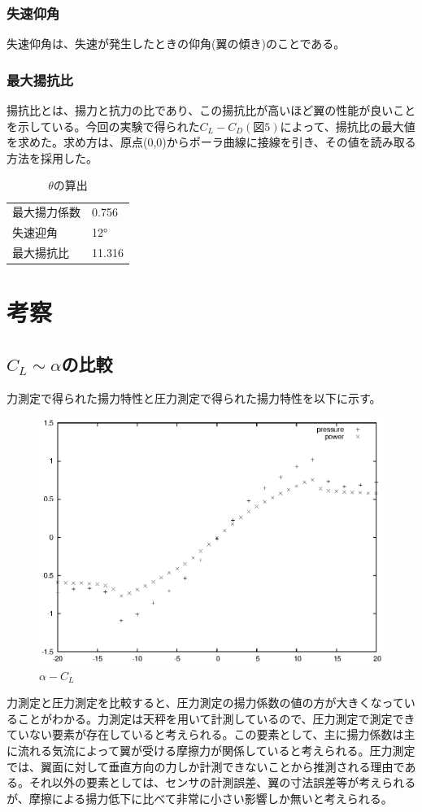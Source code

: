 \documentclass[a4j,twoside,openright,11pt]{jarticle}
\begin{document}
\subsubsection{失速仰角}
失速仰角は、失速が発生したときの仰角(翼の傾き)のことである。
\subsubsection{最大揚抗比}
揚抗比とは、揚力と抗力の比であり、この揚抗比が高いほど翼の性能が良いことを示している。今回の実験で得られた$C_L-C_D(図5)$によって、揚抗比の最大値を求めた。求め方は、原点(0,0)からポーラ曲線に接線を引き、その値を読み取る方法を採用した。

\begin{table}[htb]
\begin{center}
  \caption{$\theta$の算出}
  \begin{tabular}{ll} \hline
最大揚力係数 &0.756\\
失速迎角     &12°\\
最大揚抗比   &11.316\\
\hline
  \end{tabular}
\end{center}
\end{table}

\section{考察}
\subsection{$C_L \sim \alpha$の比較}
力測定で得られた揚力特性と圧力測定で得られた揚力特性を以下に示す。
\begin{figure}
\begin{center}
\includegraphics[width=12cm]{./2-CL-CD/CL-CD2.eps}
\end{center}
\caption{$\alpha-C_L$}
\end{figure}
力測定と圧力測定を比較すると、圧力測定の揚力係数の値の方が大きくなっていることがわかる。力測定は天秤を用いて計測しているので、圧力測定で測定できていない要素が存在していると考えられる。この要素として、主に揚力係数は主に流れる気流によって翼が受ける摩擦力が関係していると考えられる。圧力測定では、翼面に対して垂直方向の力しか計測できないことから推測される理由である。それ以外の要素としては、センサの計測誤差、翼の寸法誤差等が考えられるが、摩擦による揚力低下に比べて非常に小さい影響しか無いと考えられる。
\end{document}
